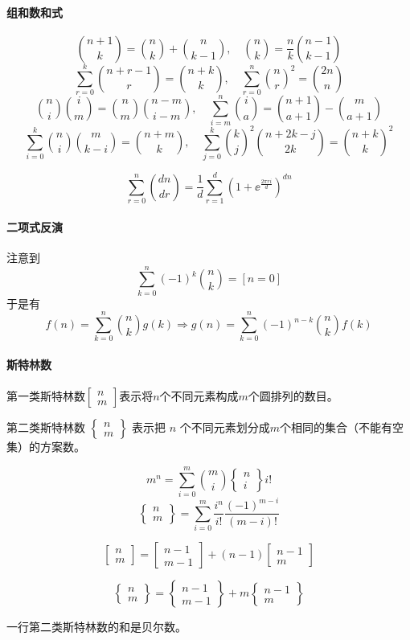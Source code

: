 \documentclass{pureart}
\begin{document}
\paragraph{组和数和式}
\[ \binom{n+1}{k} = \binom{n}{k} + \binom{n}{k-1}, \quad \binom{n}{k} = \frac{n}{k} \binom{n-1}{k-1} \]
\[ \sum\limits_{r=0}^k \binom{n+r-1}{r} = \binom{n+k}{k}, \quad \sum\limits_{r=0}^n \binom{n}{r}^2 = \binom{2n}{n} \]
\[ \binom{n}{i}\binom{i}{m} = \binom{n}{m}\binom{n-m}{i-m}, \quad \sum\limits_{i=m}^n \binom{i}{a} = \binom{n+1}{a+1} - \binom{m}{a+1} \]
\[ \sum\limits_{i=0}^k \binom{n}{i}\binom{m}{k-i} = \binom{n+m}{k}, \quad \sum\limits_{j=0}^k \binom{k}{j}^2 \binom{n+2k-j}{2k} = \binom{n+k}{k}^2 \]

\[ \sum\limits_{r=0}^n \binom{dn}{dr} = \frac{1}{d} \sum_{r=1}^d  \left( 1+\ee^{\tfrac{2\pi r i}{d}} \right)^{dn} \]

\paragraph{二项式反演}

注意到
\[ \sum_{k=0}^n (-1)^k \binom{n}{k} = [n=0] \]
于是有
\[ f(n) = \sum_{k=0}^n \binom{n}{k} g(k) \Rightarrow g(n) = \sum_{k=0}^n (-1)^{n-k}\binom{n}{k} f(k) \]

\paragraph{斯特林数}

第一类斯特林数$\begin{bmatrix}n\\ m\end{bmatrix}$表示将$n$个不同元素构成$m$个圆排列的数目。

第二类斯特林数 $\begin{Bmatrix} n \\m \end{Bmatrix}$ 表示把 $n$ 个不同元素划分成$m$个相同的集合（不能有空集）的方案数。

\[
m^n=\sum_{i=0}^m \binom m i  \left\{ \begin{matrix} n \\ i \end{matrix} \right\} i!
\]
\[\left\{ \begin{matrix} n\\m \end{matrix} \right\}=\sum_{i=0}^m \frac{i^n}{i!} \frac{(-1)^{m-i}}{(m-i)!}\]

\[\begin{bmatrix}n \\ m\end{bmatrix}=\begin{bmatrix}n-1 \\ m-1\end{bmatrix}+(n-1) \begin{bmatrix}n-1 \\ m\end{bmatrix}\]

\[\begin{Bmatrix}n \\ m\end{Bmatrix}=\begin{Bmatrix}n-1 \\ m-1\end{Bmatrix}+m \begin{Bmatrix}n-1 \\ m\end{Bmatrix}\]

一行第二类斯特林数的和是贝尔数。
\end{document}
